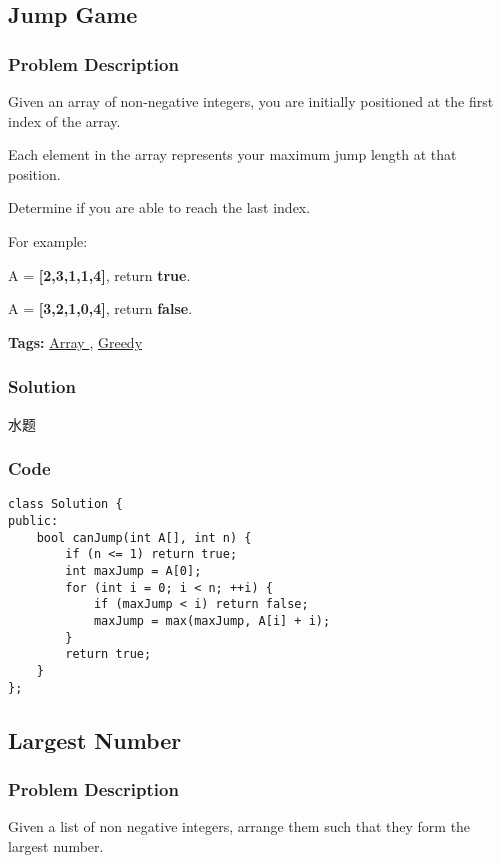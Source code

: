 \documentclass{article}
\begin{document}
\begin{CJK*}{UTF8}{gkai}
\subsection{ Jump Game }
\label{ Jump Game }

\subsubsection*{Problem Description}
Given an array of non-negative integers, you are initially positioned at the first index of the array.

Each element in the array represents your maximum jump length at that position.

Determine if you are able to reach the last index.

For example:


A = \textbf{[2,3,1,1,4]}, return \textbf{true}.

A = \textbf{[3,2,1,0,4]}, return \textbf{false}.


\textbf{Tags: }
\hyperref[ Array ]{ Array },  \hyperref[ Greedy ]{ Greedy }



\subsubsection*{Solution}
水题

\subsubsection*{Code}
\begin{lstlisting}
class Solution {
public:
    bool canJump(int A[], int n) {
        if (n <= 1) return true;
        int maxJump = A[0];
        for (int i = 0; i < n; ++i) {
            if (maxJump < i) return false;
            maxJump = max(maxJump, A[i] + i);
        }
        return true;
    }
}; 
\end{lstlisting}


\subsection{ Largest Number }
\label{ Largest Number }

\subsubsection*{Problem Description}
Given a list of non negative integers, arrange them such that they form the largest number.


\end{CJK*}
\end{document}
